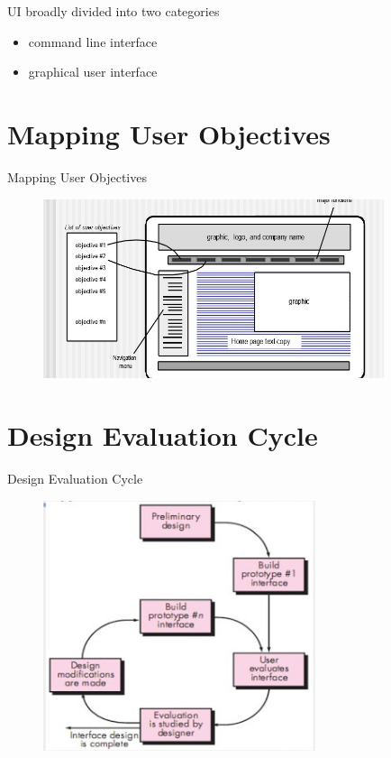 \documentclass[12pt]{beamer}
\begin{document}
\begin{frame}
\begin{block}{UI broadly divided into two categories} 
 \begin{itemize}
\item command line interface

\item graphical user interface
\end{itemize}
\end{block}
\end{frame}

\section{Mapping User Objectives}




\begin{frame}{Mapping User Objectives}
\begin{figure}[H]
\centering
\includegraphics[width=10cm]{imagenes/diagrama2.jpg}
\caption{}
\end{figure}
\end{frame}

\section{Design Evaluation Cycle}

\begin{frame}{Design Evaluation Cycle}
\begin{figure}[H]
\centering
\includegraphics[width=8cm]{imagenes/evaluation.jpg}
\caption{}
\end{figure}
\end{frame}
\end{document}
